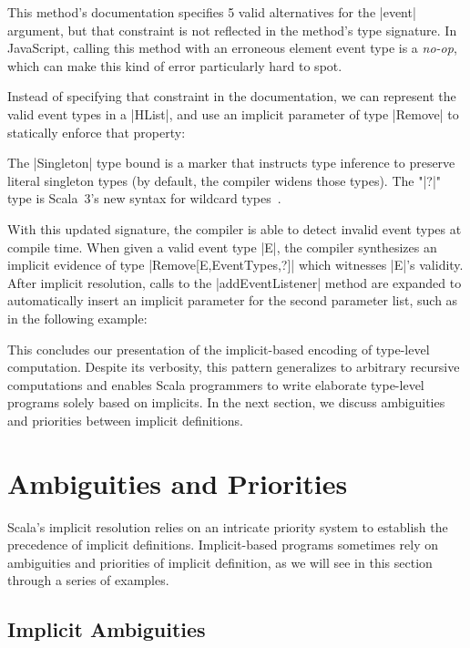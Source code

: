 \addEventListenerJS

\noindent
This method's documentation specifies 5 valid alternatives for the |event| argument, but that constraint is not reflected in the method's type signature.
In JavaScript, calling this method with an erroneous element event type is a \emph{no-op}, which can make this kind of error particularly hard to spot.

Instead of specifying that constraint in the documentation, we can represent the valid event types in a |HList|, and use an implicit parameter of type |Remove| to statically enforce that property:

\addEventListenerImplicitDef

\noindent
The |Singleton| type bound is a marker that instructs type inference to preserve literal singleton types (by default, the compiler widens those types).
The "|?|" type is Scala~3's new syntax for wildcard types~\citep[Wildcard Arguments in Types]{odersky2013scala}.

With this updated signature, the compiler is able to detect invalid event types at compile time.
When given a valid event type |E|, the compiler synthesizes an implicit evidence of type |Remove[E,EventTypes,?]| which witnesses |E|'s validity.
After implicit resolution, calls to the |addEventListener| method are expanded to automatically insert an implicit parameter for the second parameter list, such as in the following example:

\addEventListenerImplicitCall

This concludes our presentation of the implicit-based encoding of type-level computation.
Despite its verbosity, this pattern generalizes to arbitrary recursive computations and enables Scala programmers to write elaborate type-level programs solely based on implicits.
In the next section, we discuss ambiguities and priorities between implicit definitions.

\section{Ambiguities and Priorities}

Scala's implicit resolution relies on an intricate priority system to establish the precedence of implicit definitions.
Implicit-based programs sometimes rely on ambiguities and priorities of implicit definition, as we will see in this section through a series of examples.

\subsection{Implicit Ambiguities}


